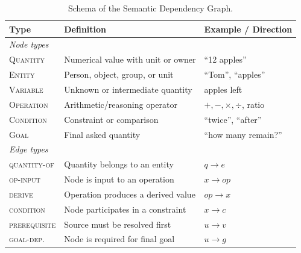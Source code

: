 \documentclass[sigconf, anonymous, review, screen]{acmart}
\begin{document}
\begin{table}[t]
\centering
\scriptsize
\caption{Schema of the Semantic Dependency Graph.}
\label{tab:sdg_schema}

\begin{tabular}{p{}p{}p{}}
\toprule
\textbf{Type} & \textbf{Definition} & \textbf{Example / Direction} \\
\midrule
\multicolumn{3}{l}{\textit{Node types}} \\
\textsc{Quantity} & Numerical value with unit or owner & ``12 apples'' \\
\textsc{Entity} & Person, object, group, or unit & ``Tom'', ``apples'' \\
\textsc{Variable} & Unknown or intermediate quantity & apples left \\
\textsc{Operation} & Arithmetic/reasoning operator & $+,-,\times,\div$, ratio \\
\textsc{Condition} & Constraint or comparison & ``twice'', ``after'' \\
\textsc{Goal} & Final asked quantity & ``how many remain?'' \\
\midrule
\multicolumn{3}{l}{\textit{Edge types}} \\
\textsc{quantity-of} & Quantity belongs to an entity & $q\!\rightarrow\!e$ \\
\textsc{op-input} & Node is input to an operation & $x\!\rightarrow\!op$ \\
\textsc{derive} & Operation produces a derived value & $op\!\rightarrow\!x$ \\
\textsc{condition} & Node participates in a constraint & $x\!\rightarrow\!c$ \\
\textsc{prerequisite} & Source must be resolved first & $u\!\rightarrow\!v$ \\
\textsc{goal-dep.} & Node is required for final goal & $u\!\rightarrow\!g$ \\
\bottomrule
\end{tabular}

\end{table}
\end{document}
